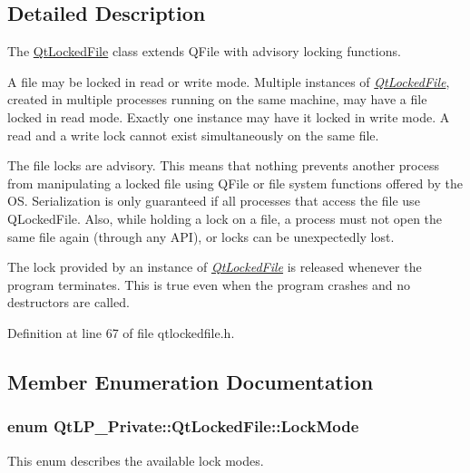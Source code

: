 \subsection{Detailed Description}
The \hyperlink{class_qt_l_p___private_1_1_qt_locked_file}{Qt\+Locked\+File} class extends Q\+File with advisory locking functions. 

A file may be locked in read or write mode. Multiple instances of {\itshape \hyperlink{class_qt_l_p___private_1_1_qt_locked_file}{Qt\+Locked\+File}}, created in multiple processes running on the same machine, may have a file locked in read mode. Exactly one instance may have it locked in write mode. A read and a write lock cannot exist simultaneously on the same file.

The file locks are advisory. This means that nothing prevents another process from manipulating a locked file using Q\+File or file system functions offered by the OS. Serialization is only guaranteed if all processes that access the file use Q\+Locked\+File. Also, while holding a lock on a file, a process must not open the same file again (through any A\+PI), or locks can be unexpectedly lost.

The lock provided by an instance of {\itshape \hyperlink{class_qt_l_p___private_1_1_qt_locked_file}{Qt\+Locked\+File}} is released whenever the program terminates. This is true even when the program crashes and no destructors are called. 

Definition at line 67 of file qtlockedfile.\+h.



\subsection{Member Enumeration Documentation}
\subsubsection[{\texorpdfstring{Lock\+Mode}{LockMode}}]{\setlength{\rightskip}{0pt plus 5cm}enum {\bf Qt\+L\+P\+\_\+\+Private\+::\+Qt\+Locked\+File\+::\+Lock\+Mode}}\hypertarget{class_qt_l_p___private_1_1_qt_locked_file_ab9a54228983e33cf1fb8dace52141f26}{}\label{class_qt_l_p___private_1_1_qt_locked_file_ab9a54228983e33cf1fb8dace52141f26}
This enum describes the available lock modes.

